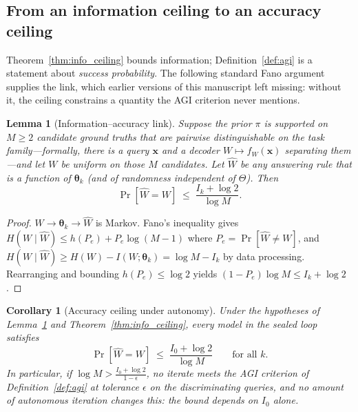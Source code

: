 \documentclass[11pt,a4paper]{article}
\newtheorem{lemma}[theorem]{Lemma}
\newtheorem{corollary}[theorem]{Corollary}
\begin{document}
\subsection{From an information ceiling to an accuracy ceiling}
\label{sec:fano}

Theorem~\ref{thm:info_ceiling} bounds information; Definition~\ref{def:agi} is a statement about \emph{success probability}. The following standard Fano argument supplies the link, which earlier versions of this manuscript left missing: without it, the ceiling constrains a quantity the AGI criterion never mentions.

\begin{lemma}[Information--accuracy link]
\label{lem:fano}
Suppose the prior $\pi$ is supported on $M \geq 2$ candidate ground truths that are pairwise distinguishable on the task family---formally, there is a query $\bm{x}$ and a decoder $W \mapsto f_W(\bm{x})$ separating them---and let $W$ be uniform on those $M$ candidates. Let $\hat{W}$ be any answering rule that is a function of $\bm{\theta}_k$ (and of randomness independent of $\Theta$). Then
\begin{equation}
\Pr[\hat{W} = W] \;\leq\; \frac{I_k + \log 2}{\log M}.
\end{equation}
\end{lemma}

\begin{proof}
$W \to \bm{\theta}_k \to \hat{W}$ is Markov. Fano's inequality gives $H(W \mid \hat{W}) \leq h(P_e) + P_e \log(M-1)$ where $P_e = \Pr[\hat W \neq W]$, and $H(W \mid \hat W) \geq H(W) - I(W; \bm{\theta}_k) = \log M - I_k$ by data processing. Rearranging and bounding $h(P_e) \leq \log 2$ yields $(1 - P_e)\log M \leq I_k + \log 2$.
\end{proof}

\begin{corollary}[Accuracy ceiling under autonomy]
\label{cor:accuracy_ceiling}
Under the hypotheses of Lemma~\ref{lem:fano} and Theorem~\ref{thm:info_ceiling}, every model in the sealed loop satisfies
\begin{equation}
\Pr[\hat{W} = W] \;\leq\; \frac{I_0 + \log 2}{\log M}
\qquad \text{for all } k .
\end{equation}
In particular, if $\log M > \frac{I_0 + \log 2}{1 - \epsilon}$, no iterate meets the AGI criterion of Definition~\ref{def:agi} at tolerance $\epsilon$ on the discriminating queries, and no amount of autonomous iteration changes this: the bound depends on $I_0$ alone.
\end{corollary}
\end{document}
